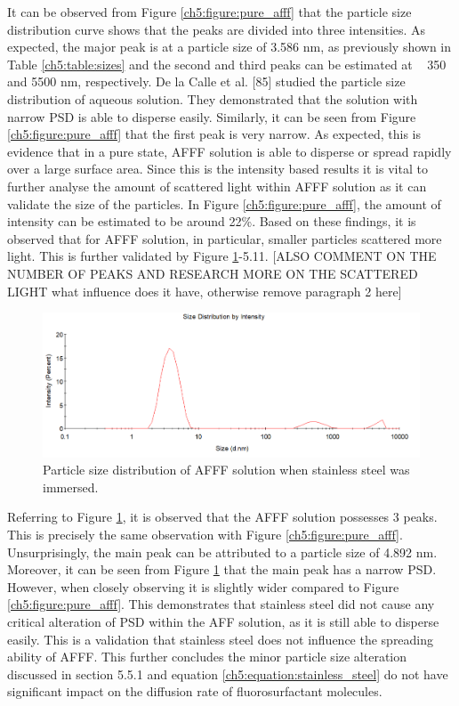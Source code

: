\documentclass[12pt]{report}
\begin{document}
 It can be observed from Figure \ref{ch5:figure:pure_afff} that the particle size distribution curve shows that the peaks are divided into three intensities. As expected, the major peak is at a particle size of 3.586 nm, as previously shown in Table \ref{ch5:table:sizes} and the second and third peaks can be estimated at ~ 350 and 5500 nm, respectively. De la Calle et al. [85] studied the particle size distribution of aqueous solution. They demonstrated that the solution with narrow PSD is able to disperse easily. Similarly, it can be seen from Figure \ref{ch5:figure:pure_afff} that the first peak is very narrow. As expected, this is evidence that in a pure state, AFFF solution is able to disperse or spread rapidly over a large surface area. 
 Since this is the intensity based results it is vital to further analyse the amount of scattered light within AFFF solution as it can validate the size of the particles. In Figure \ref{ch5:figure:pure_afff}, the amount of intensity can be estimated to be around 22\%. Based on these findings, it is observed that for AFFF solution, in particular, smaller particles scattered more light. This is further validated by Figure \ref{ch5:figure:stainless_steel}-5.11.
 [ALSO COMMENT ON THE NUMBER OF PEAKS AND RESEARCH MORE ON THE SCATTERED LIGHT what influence does it have, otherwise remove paragraph 2 here]

\begin{figure}[H]
    \centering
    \includegraphics[width=.8\textwidth]{particle_size_distribution_of_afff_solution_when_stainless_steel_was_immersed.png}
    \caption{Particle size distribution of AFFF solution when stainless steel was immersed.}
    \label{ch5:figure:stainless_steel}
\end{figure}

Referring to Figure \ref{ch5:figure:stainless_steel}, it is observed that the AFFF solution possesses 3 peaks. This is precisely the same observation with Figure \ref{ch5:figure:pure_afff}. Unsurprisingly, the main peak can be attributed to a particle size of 4.892 nm. Moreover, it can be seen from Figure \ref{ch5:figure:stainless_steel} that the main peak has a narrow PSD. However, when closely observing it is slightly wider compared to Figure \ref{ch5:figure:pure_afff}. This demonstrates that stainless steel did not cause any critical alteration of PSD within the AFF solution, as it is still able to disperse easily. This is a validation that stainless steel does not influence the spreading ability of AFFF. This further concludes the minor particle size alteration discussed in section 5.5.1 and equation \ref{ch5:equation:stainless_steel} do not have significant impact on the diffusion rate of fluorosurfactant molecules.     
  
\end{document}
